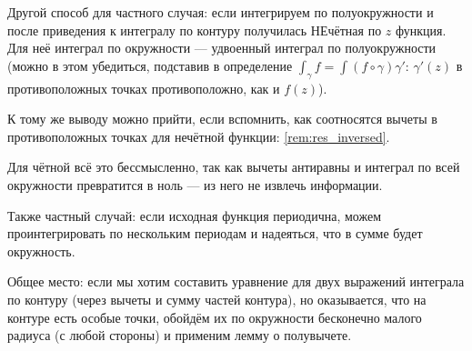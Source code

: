 \documentclass[12pt, a4paper]{article}
\begin{document}
\begin{remark}
  Другой способ для частного случая: если интегрируем по полуокружности и после приведения к интегралу по контуру получилась НЕчётная по $z$ функция.
  Для неё интеграл по окружности — удвоенный интеграл по полуокружности (можно в этом убедиться, подставив в определение $\int_\gamma f = \int (f \circ \gamma) \gamma'$: 
  $\gamma'(z)$ в противоположных точках противоположно, как и $f(z)$).

  К тому же выводу можно прийти, если вспомнить, как соотносятся вычеты в противоположных точках для нечётной функции: \ref{rem:res_inversed}.

  Для чётной всё это бессмысленно, так как вычеты антиравны и интеграл по всей окружности превратится в ноль — из него не извлечь информации.
\end{remark}

\begin{remark}
  Также частный случай: если исходная функция периодична, можем проинтегрировать по нескольким периодам и надеяться, что в сумме будет окружность.
\end{remark}

Общее место: если мы хотим составить уравнение для двух выражений интеграла по контуру (через вычеты и сумму частей контура), 
но оказывается, что на контуре есть особые точки, обойдём их по окружности бесконечно малого радиуса (с любой стороны) и применим лемму о полувычете.
\end{document}
